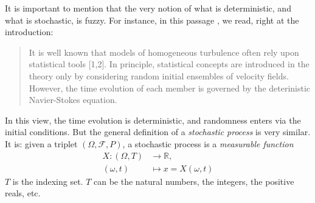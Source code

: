 \documentclass[12pt]{article}
\begin{document}
It is important to mention that the very notion of what is deterministic, and
what is stochastic, is fuzzy.  For instance, in this passage
\cite{breuer.petruccione--burgers.model}, we read, right at the introduction:
\begin{quote}
It is well known that models of homogeneous turbulence often rely upon
statistical tools [1,2]. In principle, statistical concepts are introduced in
the theory only by considering random initial ensembles of velocity
fields. However, the time evolution of each member is governed by the
deterinistic Navier-Stokes equation.
\end{quote}
In this view, the time evolution is deterministic, and randomness enters via the
initial conditions.  But the general definition of a \emph{stochastic process}
is very similar. It is: given a triplet $(\Omega,\mathcal{F},P)$, a stochastic
process is a \emph{measurable function}
\begin{align*}
   X: (\Omega,T) &\rightarrow \mathbb{R},\\
        (\omega,t)        &\mapsto x = X(\omega,t)
\end{align*}
$T$ is the indexing set. $T$ can be the natural numbers, the integers, the
positive reals, etc.











\end{document}
